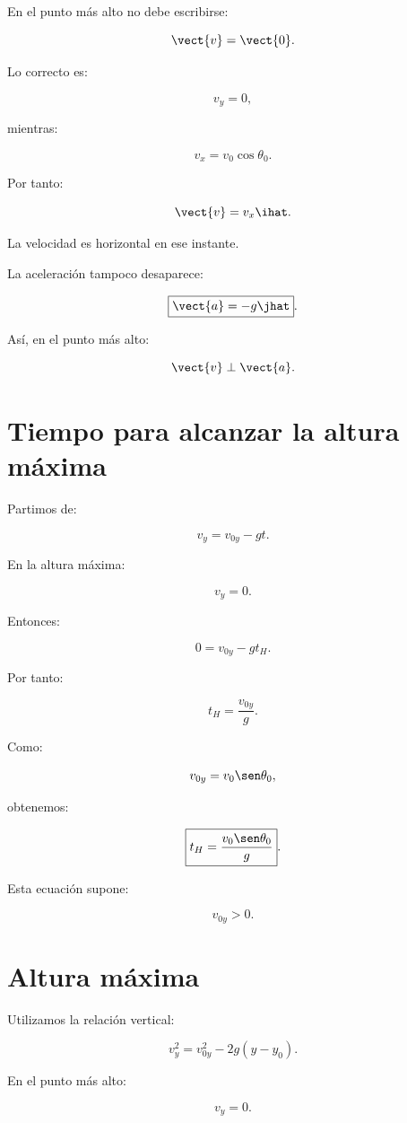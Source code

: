 \begin{errorfrecuente}
En el punto más alto no debe escribirse:

\[
\vect{v}=\vect{0}.
\]

Lo correcto es:

\[
v_y=0,
\]

mientras:

\[
v_x=v_0\cos\theta_0.
\]

Por tanto:

\[
\vect{v}
=
v_x\ihat.
\]

La velocidad es horizontal en ese instante.
\end{errorfrecuente}

La aceleración tampoco desaparece:

\[
\boxed{
\vect{a}=-g\jhat
}.
\]

Así, en el punto más alto:

\[
\vect{v}\perp\vect{a}.
\]


\section{Tiempo para alcanzar la altura máxima}

Partimos de:

\[
v_y=v_{0y}-gt.
\]

En la altura máxima:

\[
v_y=0.
\]

Entonces:

\[
0=v_{0y}-gt_H.
\]

Por tanto:

\[
\boxed{
t_H=\frac{v_{0y}}{g}
}.
\]

Como:

\[
v_{0y}=v_0\sen\theta_0,
\]

obtenemos:

\[
\boxed{
t_H
=
\frac{v_0\sen\theta_0}{g}
}.
\]

Esta ecuación supone:

\[
v_{0y}>0.
\]


\section{Altura máxima}

Utilizamos la relación vertical:

\[
v_y^2
=
v_{0y}^2
-
2g(y-y_0).
\]

En el punto más alto:

\[
v_y=0.
\]

